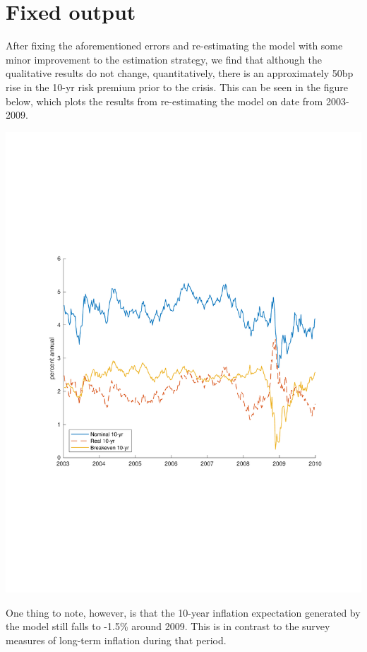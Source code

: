 \documentclass{report}
\begin{document}
 
\section{Fixed output}
 
After fixing the aforementioned errors and re-estimating the model with some minor improvement to the estimation strategy, we find that although the qualitative results do not change, quantitatively, there is an approximately 50bp rise in the 10-yr risk premium prior to the crisis. This can be seen in the figure below, which plots the results from re-estimating the model on date from 2003-2009.
\begin{center}
\includegraphics[page=5, trim={5cm 6cm 5cm 6.5cm}]{Figs-Orig-Reest-Parms.pdf}
\end{center}

One thing to note, however, is that the 10-year inflation expectation generated by the model still falls to -1.5\% around 2009. This is in contrast to the survey measures of long-term inflation during that period.\\
\end{document}
